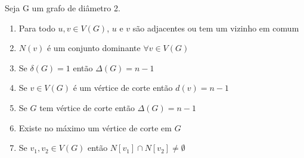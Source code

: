 \begin{proposition} Seja G um grafo de diâmetro 2.
\begin{enumerate}[label=(\alph*)] %
   \label{prop:diametro2}
    \item{Para todo $u,v \in V(G)$, $u$ e $v$ são adjacentes ou tem um vizinho em comum} \label{pro-diam-2-itema}
    \item{$N(v)$ é um conjunto dominante $\forall v \in V(G)$} \label{pro-diam-2-itemb}
    \item{Se $\delta(G)=1$ então $\Delta(G)=n-1$}
    \item Se $v \in V(G)$ é um vértice de corte então $d(v)=n-1$\label{pro-diam-2-itemd}
    \item{Se $G$ tem vértice de corte então $\Delta(G)=n-1$}\label{pro-diam-2-iteme}
    \item Existe no máximo um vértice de corte em $G$\label{pro-diam-2-itemf}
    \item{Se $v_1,v_2 \in V(G)$ então $N[v_1] \cap N[v_2] \ne \emptyset$}
\end{enumerate}
\end{proposition}
